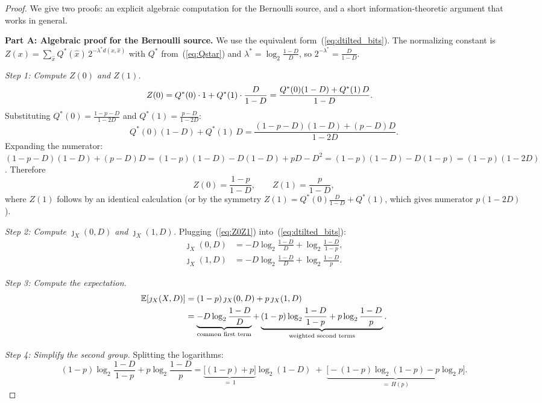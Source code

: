 \documentclass[11pt]{article}
\newcommand{\E}{\mathbb{E}}
\begin{document}
\begin{proof}
We give two proofs: an explicit algebraic computation for the Bernoulli source,
and a short information-theoretic argument that works in general.

\smallskip
\noindent\textbf{Part A: Algebraic proof for the Bernoulli source.}
We use the equivalent form~(\ref{eq:dtilted_bits}).
The normalizing constant is $Z(x) = \sum_{\hat{x}} Q^*(\hat{x})\,
2^{-\lambda^* d(x,\hat{x})}$ with $Q^*$ from~(\ref{eq:Qstar})
and $\lambda^* = \log_2\frac{1-D}{D}$, so $2^{-\lambda^*} = \frac{D}{1-D}$.

\smallskip
\noindent\emph{Step 1: Compute $Z(0)$ and $Z(1)$.}
\begin{align}
Z(0) &= Q^*(0)\cdot 1 + Q^*(1)\cdot\frac{D}{1-D}
= \frac{Q^*(0)(1-D) + Q^*(1)\,D}{1-D}. \notag
\end{align}
Substituting $Q^*(0) = \frac{1-p-D}{1-2D}$ and $Q^*(1) = \frac{p-D}{1-2D}$:
\[
Q^*(0)(1-D) + Q^*(1)\,D
= \frac{(1-p-D)(1-D) + (p-D)D}{1-2D}.
\]
Expanding the numerator:
$(1-p-D)(1-D) + (p-D)D = (1-p)(1-D) - D(1-D) + pD - D^2
= (1-p)(1-D) - D(1-p) = (1-p)(1-2D)$.
Therefore
\begin{equation}
\label{eq:Z0Z1}
Z(0) = \frac{1-p}{1-D}, \qquad
Z(1) = \frac{p}{1-D},
\end{equation}
where $Z(1)$ follows by an identical calculation (or by the symmetry
$Z(1) = Q^*(0)\frac{D}{1-D} + Q^*(1)$, which gives numerator $p(1-2D)$).

\smallskip
\noindent\emph{Step 2: Compute $\jmath_X(0,D)$ and $\jmath_X(1,D)$.}
Plugging~(\ref{eq:Z0Z1}) into~(\ref{eq:dtilted_bits}):
\begin{align}
\jmath_X(0, D) &= -D\log_2\frac{1-D}{D} + \log_2\frac{1-D}{1-p},
\label{eq:jx0_simplified}\\
\jmath_X(1, D) &= -D\log_2\frac{1-D}{D} + \log_2\frac{1-D}{p}.
\label{eq:jx1_simplified}
\end{align}

\smallskip
\noindent\emph{Step 3: Compute the expectation.}
\begin{align}
\E[\jmath_X(X,D)]
&= (1-p)\,\jmath_X(0,D) + p\,\jmath_X(1,D) \notag\\
&= \underbrace{-D\log_2\frac{1-D}{D}}_{\text{common first term}}
   + \underbrace{(1-p)\log_2\frac{1-D}{1-p} + p\log_2\frac{1-D}{p}}_{\text{weighted second terms}}.
   \label{eq:Ej_expanded}
\end{align}

\smallskip
\noindent\emph{Step 4: Simplify the second group.}
Splitting the logarithms:
\[
(1-p)\log_2\frac{1-D}{1-p} + p\log_2\frac{1-D}{p}
= \underbrace{\bigl[(1-p) + p\bigr]}_{=\,1}\log_2(1-D)
  \;+\; \underbrace{\bigl[-(1-p)\log_2(1-p) - p\log_2 p\bigr]}_{=\,H(p)}.
\]


\end{proof}
\end{document}
